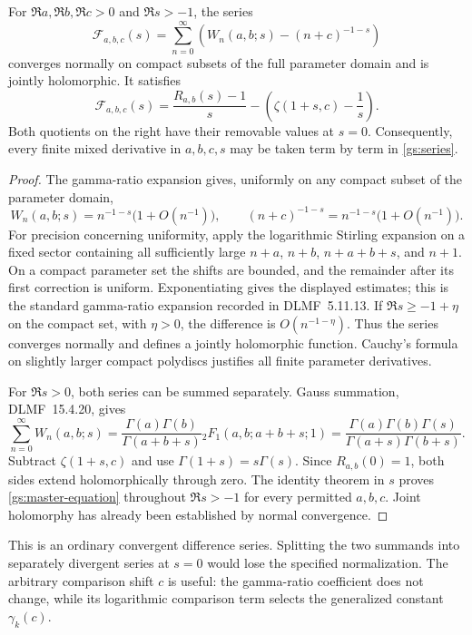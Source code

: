 \begin{theorem}\label{gs:master}
For $\Re a,\Re b,\Re c>0$ and $\Re s>-1$, the series
\begin{equation}\label{gs:series}
 \mathcal F_{a,b,c}(s)=
 \sum_{n=0}^{\infty}
 \left(W_n(a,b;s)-(n+c)^{-1-s}\right)
\end{equation}
converges normally on compact subsets of the full parameter domain and
is jointly holomorphic.  It satisfies
\begin{equation}\label{gs:master-equation}
 \mathcal F_{a,b,c}(s)
 =\frac{R_{a,b}(s)-1}{s}
  -\left(\zeta(1+s,c)-\frac1s\right).
\end{equation}
Both quotients on the right have their removable values at $s=0$.
Consequently, every finite mixed derivative in $a,b,c,s$ may be taken
term by term in \eqref{gs:series}.
\end{theorem}

\begin{proof}
The gamma-ratio expansion gives, uniformly on any compact subset of
the parameter domain,
\[
 W_n(a,b;s)=n^{-1-s}\bigl(1+O(n^{-1})\bigr),\qquad
 (n+c)^{-1-s}=n^{-1-s}\bigl(1+O(n^{-1})\bigr).
\]
For precision concerning uniformity, apply the logarithmic Stirling
expansion on a fixed sector containing all sufficiently large $n+a$,
$n+b$, $n+a+b+s$, and $n+1$.  On a compact parameter set the shifts are
bounded, and the remainder after its first correction is uniform.
Exponentiating gives the displayed estimates; this is the standard
gamma-ratio expansion recorded in DLMF~5.11.13.
If $\Re s\ge -1+\eta$ on the compact set, with $\eta>0$, the difference
is $O(n^{-1-\eta})$.  Thus the series converges normally and defines a
jointly holomorphic function.  Cauchy's formula on slightly larger
compact polydiscs justifies all finite parameter derivatives.

For $\Re s>0$, both series can be summed separately.  Gauss summation,
DLMF~15.4.20, gives
\[
 \sum_{n=0}^{\infty}W_n(a,b;s)
 =\frac{\Gamma(a)\Gamma(b)}{\Gamma(a+b+s)}
 {}_2F_1(a,b;a+b+s;1)
 =\frac{\Gamma(a)\Gamma(b)\Gamma(s)}
 {\Gamma(a+s)\Gamma(b+s)}.
\]
Subtract $\zeta(1+s,c)$ and use $\Gamma(1+s)=s\Gamma(s)$.
Since $R_{a,b}(0)=1$, both sides extend holomorphically through zero.
The identity theorem in $s$ proves \eqref{gs:master-equation} throughout
$\Re s>-1$ for every permitted $a,b,c$.  Joint holomorphy has already
been established by normal convergence.
\end{proof}

This is an ordinary convergent difference series.  Splitting the two
summands into separately divergent series at $s=0$ would lose the
specified normalization.  The arbitrary comparison shift $c$ is useful:
the gamma-ratio coefficient does not change, while its logarithmic
comparison term selects the generalized constant $\gamma_k(c)$.

